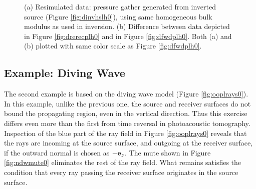 \documentclass[12pt]{geophysics}
\begin{document}
\begin{figure}
  \centering
  \caption{(a) Resimulated data: pressure gather generated from
    inverted source (Figure \ref{fig:dinvhslh0}), using same
    homogeneous bulk modulus as used in inversion. (b) Difference
    between data depicted in Figure \ref{fig:drerecplh0} and in Figure \ref{fig:dfwdplh0}.
    Both (a) and (b) plotted with same color scale as Figure \ref{fig:dfwdplh0}.}
\end{figure}
  
\subsection{Example: Diving Wave}

The second example is based on the diving wave model (Figure
\ref{fig:ooplrays0}). In this example, unlike the previous one, the source
and receiver surfaces do not bound the propagating region, even in the
vertical direction. Thus this exercise differs even more than the
first from time reversal in photoacoustic tomography. Inspection of
the blue part of the ray field in Figure \ref{fig:ooplrays0} reveals that
the rays are incoming at the source surface, and outgoing at the receiver surface, if the
outward normal is chosen as $-{\bf e}_z$. The mute shown in Figure
\ref{fig:ndwmute0} eliminates the rest of the ray field. What remains
satisfies the condition that every ray passing the receiver surface
originates in the source surface.
\end{document}
